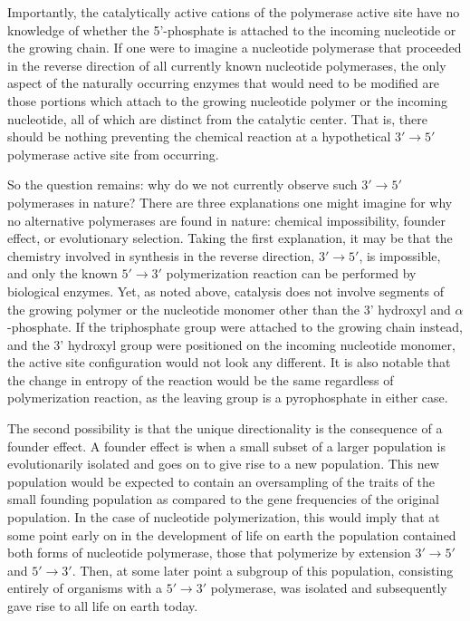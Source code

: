 Importantly, the catalytically active cations of the polymerase active site have no knowledge of whether the 5'-phosphate is attached to the incoming nucleotide or the growing chain. If one were to imagine a nucleotide polymerase that proceeded in the reverse direction of all currently known nucleotide polymerases, the only aspect of the naturally occurring enzymes that would need to be modified are those portions which attach to the growing nucleotide polymer or the incoming nucleotide, all of which are distinct from the catalytic center. That is, there should be nothing preventing the chemical reaction at a hypothetical $3'\to5'$ polymerase active site from occurring.

So the question remains: why do we not currently observe such $3'\to5'$ polymerases in nature? There are three explanations one might imagine for why no alternative polymerases are found in nature: chemical impossibility, founder effect, or evolutionary selection. Taking the first explanation, it may be that the chemistry involved in synthesis in the reverse direction, $3'\to5'$, is impossible, and only the known $5'\to3'$ polymerization reaction can be performed by biological enzymes. Yet, as noted above, catalysis does not involve segments of the growing polymer or the nucleotide monomer other than the 3' hydroxyl and $\alpha$-phosphate. If the triphosphate group were attached to the growing chain instead, and the 3' hydroxyl group were positioned on the incoming nucleotide monomer, the active site configuration would not look any different. It is also notable that the change in entropy of the reaction would be the same regardless of polymerization reaction, as the leaving group is a pyrophosphate in either case.

The second possibility is that the unique directionality is the consequence of a founder effect. A founder effect is when a small subset of a larger population is evolutionarily isolated and goes on to give rise to a new population. This new population would be expected to contain an oversampling of the traits of the small founding population as compared to the gene frequencies of the original population\cite{Templeton:1980p954}. In the case of nucleotide polymerization, this would imply that at some point early on in the development of life on earth the population contained both forms of nucleotide polymerase, those that polymerize by extension $3'\to5'$ and $5'\to3'$. Then, at some later point a subgroup of this population, consisting entirely of organisms with a $5'\to3'$ polymerase, was isolated and subsequently gave rise to all life on earth today.

